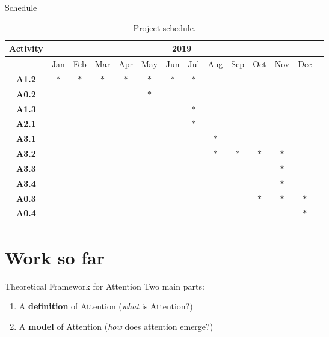 \documentclass[10pt]{beamer}
\begin{document}
\begin{frame}{Schedule}
    \begin{table}[H]
    \centering
    \caption{\small Project schedule.}
    \tiny
    \begin{tabular}{|c|c|c|c|c|c|c|c|c|c|c|c|c|c|}
        \hline
        \textbf{Activity} & \multicolumn{12}{|c|}{\textbf{2019}}\\
        \hline
                      & Jan & Feb & Mar & Apr & May & Jun & Jul & Aug & Sep & Oct & Nov & Dec\\
        \hline
        \textbf{A1.2} & $*$ & $*$ & $*$ & $*$ & $*$ & $*$ & $*$ &     &     &     &     &     \\
        \hline
        \textbf{A0.2} &     &     &     &     & $*$ &     &     &     &     &     &     &     \\
        \hline
        \textbf{A1.3} &     &     &     &     &     &     & $*$ &     &     &     &     &     \\
        \hline
        \textbf{A2.1} &     &     &     &     &     &     & $*$ &     &     &     &     &     \\
        \hline
        \textbf{A3.1} &     &     &     &     &     &     &     & $*$ &     &     &     &     \\
        \hline
        \textbf{A3.2} &     &     &     &     &     &     &     & $*$ & $*$ & $*$ & $*$ &     \\
        \hline
        \textbf{A3.3} &     &     &     &     &     &     &     &     &     &     & $*$ &     \\
        \hline
        \textbf{A3.4} &     &     &     &     &     &     &     &     &     &     & $*$ &     \\
        \hline
        \textbf{A0.3} &     &     &     &     &     &     &     &     &     & $*$ & $*$ & $*$ \\
        \hline
        \textbf{A0.4} &     &     &     &     &     &     &     &     &     &     &     & $*$ \\
        \hline
    \end{tabular}
    \label{table:sched}
    \end{table}
\end{frame}

\section{Work so far}

\begin{frame}{Theoretical Framework for Attention}
    Two main parts:
    \begin{enumerate}
        \item A \textbf{definition} of Attention (\emph{what} is Attention?)
        \item A \textbf{model} of Attention (\emph{how} does attention emerge?)
    \end{enumerate}
\end{frame}
\end{document}
